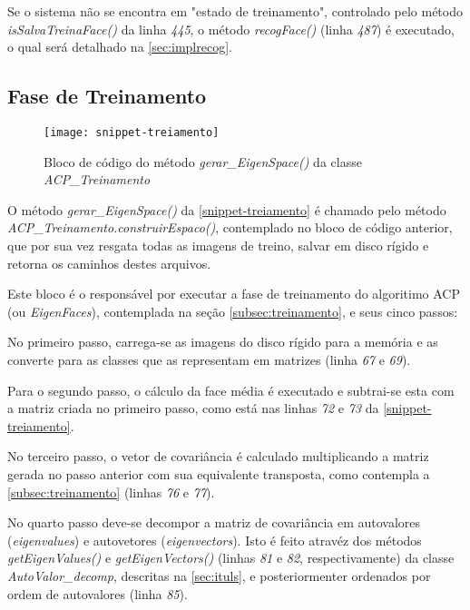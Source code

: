 Se o sistema não se encontra em "estado de treinamento", controlado pelo método \textit{isSalvaTreinaFace()} da linha \textit{445}, o método \textit{recogFace()} (linha \textit{487}) é executado, o qual será detalhado na \autoref{sec:implrecog}.


\subsection{Fase de Treinamento}\label{sec:impltrein}

\begin{figure}[h]
	\centering
	\texttt{[image: snippet-treiamento]}
	\caption{Bloco de código do método \textit{gerar\_EigenSpace()} da classe \textit{ACP\_Treinamento}}
	\label{snippet-treiamento}
\end{figure}


O método \textit{gerar\_EigenSpace()} da \autoref{snippet-treiamento} é chamado pelo método \textit{ACP\_Treinamento.construirEspaco()}, contemplado no bloco de código anterior, que por sua vez resgata todas as imagens de treino, salvar em disco rígido e retorna os caminhos destes arquivos.

Este bloco é o responsável por executar a fase de treinamento do algoritimo ACP (ou \textit{EigenFaces}), contemplada na seção \autoref{subsec:treinamento}, e seus cinco passos:

No primeiro passo, carrega-se as imagens do disco rígido para a memória e as converte para as classes que as representam em matrizes (linha \textit{67} e \textit{69}). 

Para o segundo passo, o cálculo da face média é executado e subtrai-se esta com a matriz criada no primeiro passo, como está nas linhas \textit{72} e \textit{73} da  \autoref{snippet-treiamento}.

No terceiro passo, o vetor de covariância é calculado multiplicando a matriz gerada no passo anterior com sua equivalente transposta, como contempla a \autoref{subsec:treinamento} (linhas \textit{76} e \textit{77}).

No quarto passo deve-se decompor a matriz de covariância em autovalores (\textit{eigenvalues}) e autovetores (\textit{eigenvectors}). Isto é feito atravéz dos métodos \textit{getEigenValues()} e \textit{getEigenVectors()} (linhas \textit{81} e \textit{82}, respectivamente) da classe \textit{AutoValor\_decomp}, descritas na \autoref{sec:ituls}, e posteriormenter ordenados por ordem de autovalores (linha \textit{85}).

